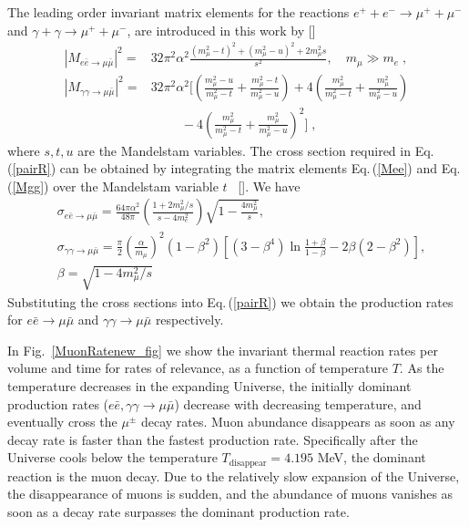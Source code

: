 The leading order invariant matrix elements for the reactions $e^++e^-\to\mu^++\mu^-$ and $\gamma+\gamma\to\mu^++\mu^-$, are introduced in this work by [\cite{Kuznetsova:2008jt}]
\begin{align}\label{Mee}
|M_{e\bar e\to\mu\bar\mu}|^2=&32\pi^2\alpha^2\frac{(m_\mu^2-t)^2+(m_\mu^2-u)^2+2m_\mu^2s}{s^2},\quad m_\mu\gg m_e\;,\\[0.2cm]
\label{Mgg}
|M_{\gamma\gamma\to\mu\bar\mu}|^2=&32\pi^2\alpha^2\bigg[\left(\frac{m_\mu^2-u}{m_\mu^2-t}+\frac{m_\mu^2-t}{m_\mu^2-u}\right)+4\left(\frac{m_\mu^2}{m_\mu^2-t}+\frac{m_\mu^2}{m^2_\mu-u}\right)\\[0.1cm]  \nonumber
&\hspace{1cm}-4\left(\frac{m_\mu^2}{m^2_\mu-t}+\frac{m^2_\mu}{m^2_\mu-u}\right)^2\bigg]\;,
\end{align}
 where $s, t, u$ are the Mandelstam variables. The cross section required in Eq.\,(\ref{pairR}) can be obtained by integrating the matrix elements Eq.\,(\ref{Mee}) and Eq.\,(\ref{Mgg}) over the Mandelstam variable $t$ ~[\cite{PhysRevC.82.035203}]. We have
\begin{align}
&\sigma_{e\bar e\to\mu\bar\mu} 
=\frac{64\pi\alpha^2}{48\pi}\left(\frac{1+2m^2_\mu/s}{s-4m_e^2}\right)\sqrt{1-\frac{4m^2_\mu}{s}},\\
&\sigma_{\gamma\gamma\to\mu\bar\mu}=\frac{\pi}{2}\left(\frac{\alpha}{m_\mu}\right)^2(1-\beta^2)\left[(3-\beta^4)\ln\frac{1+\beta}{1-\beta}-2\beta(2-\beta^2)\right],\\
&\beta=\sqrt{1-4m^2_\mu/s}
\end{align}
Substituting the cross sections into Eq.\,(\ref{pairR}) we obtain the production rates for $e\bar e\to\mu\bar\mu$ and $\gamma\gamma\to\mu\bar\mu$ respectively.

 
In Fig.~\ref{MuonRatenew_fig} we show the invariant thermal reaction rates per volume and time for rates of relevance, as a function of temperature $T$.
As the temperature decreases in the expanding Universe, the initially dominant production rates ($e\bar e,\gamma\gamma\to\mu\bar\mu$) decrease with decreasing temperature, and eventually cross the $\mu^\pm$ decay rates. 
Muon abundance disappears as soon as any decay rate is faster than the fastest production rate. Specifically after the Universe cools below the temperature $T_\mathrm{disappear}=4.195$ MeV, the dominant reaction is the muon decay. Due to the relatively slow expansion of the Universe, the disappearance of muons is sudden, and the abundance of muons vanishes as soon as a decay rate surpasses the dominant production rate.
 

